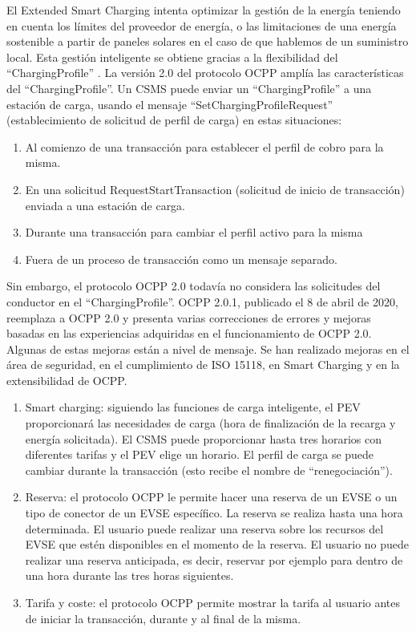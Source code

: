 \documentclass[12pt,a4paper,onecolumn,oneside]{report}
\begin{document}
El Extended Smart Charging intenta optimizar la gestión de la energía teniendo en cuenta los límites del proveedor de energía, o las limitaciones de una energía sostenible a partir de paneles solares en el caso de que hablemos de un suministro local. Esta gestión inteligente se obtiene gracias a la flexibilidad del ``ChargingProfile” . La versión 2.0 del protocolo OCPP amplía las características del ``ChargingProfile”. Un CSMS puede enviar un ``ChargingProfile” a una estación de carga, usando el mensaje ``SetChargingProfileRequest” (establecimiento de solicitud de perfil de carga) en estas situaciones:

\begin{enumerate}

\item Al comienzo de una transacción para establecer el perfil de cobro para la misma.
\item En una solicitud RequestStartTransaction (solicitud de inicio de transacción) enviada a una estación de carga.
\item Durante una transacción para cambiar el perfil activo para la misma
\item Fuera de un proceso de transacción como un mensaje separado.

\end{enumerate}

Sin embargo, el protocolo OCPP 2.0 todavía no considera las solicitudes del conductor en el ``ChargingProfile”. OCPP 2.0.1, publicado el 8 de abril de 2020, reemplaza a OCPP 2.0 y presenta varias correcciones de errores y mejoras basadas en las experiencias adquiridas en el funcionamiento de OCPP 2.0. Algunas de estas mejoras están a nivel de mensaje. Se han realizado mejoras en el área de seguridad, en el cumplimiento de ISO 15118, en Smart Charging y en la extensibilidad de OCPP.

\begin{enumerate}

\item Smart charging: siguiendo las funciones de carga inteligente, el PEV proporcionará las necesidades de carga (hora de finalización de la recarga y energía solicitada). El CSMS puede proporcionar hasta tres horarios con diferentes tarifas y el PEV elige un horario. El perfil de carga se puede cambiar durante la transacción (esto recibe el nombre de ``renegociación”).
\item Reserva: el protocolo OCPP le permite hacer una reserva de un EVSE o un tipo de conector de un EVSE específico. La reserva se realiza hasta una hora determinada. El usuario puede realizar una reserva sobre los recursos del EVSE que estén disponibles en el momento de la reserva. El usuario no puede realizar una reserva anticipada, es decir, reservar por ejemplo para dentro de una hora durante las tres horas siguientes.
\item Tarifa y coste: el protocolo OCPP permite mostrar la tarifa al usuario antes de iniciar la transacción, durante y al final de la misma.

\end{enumerate}
\end{document}
